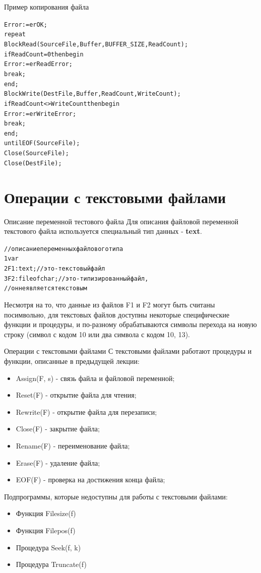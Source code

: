 \documentclass{beamer}
\begin{document}
\begin{frame}[fragile]{Пример копирования файла}
\begin{alltt}
  Error := erOK;
  repeat
    BlockRead(SourceFile, Buffer, BUFFER_SIZE, ReadCount);
    if ReadCount = 0 then begin
      Error := erReadError;
      break;
    end;
    BlockWrite(DestFile, Buffer, ReadCount, WriteCount);
    if ReadCount <> WriteCount then begin
      Error := erWriteError;
      break;
    end;
  until EOF(SourceFile);
  Close(SourceFile); 
  Close(DestFile);
\end{alltt}
\end{frame}

\section{Операции с текстовыми файлами}
\begin{frame}
  \tableofcontents[currentsection]
\end{frame}

\begin{frame}[fragile]{Описание переменной тестового файла}
Для описания файловой переменной текстового файла используется специальный тип данных - \textbf{text}.
\begin{alltt}
//описание переменных файлового типа
1 var                  
2   F1: text; //это - текстовый файл
3   F2: file of char; //это - типизированный файл,
                      //он не является текстовым
\end{alltt}
Несмотря на то, что данные из файлов F1 и F2 могут быть считаны посимвольно, для текстовых файлов доступны некоторые специфические функции и процедуры, и по-разному обрабатываются символы перехода на новую строку (символ с кодом 10 или два символа с кодом 10, 13). 
\end{frame}

\begin{frame}[fragile]{Операции с текстовыми файлами}
С текстовыми файлами работают процедуры и функции, описанные в предыдущей лекции:
\begin{itemize}
\item Assign(F, s) - связь файла и файловой переменной;
\item Reset(F) - открытие файла для чтения;
\item Rewrite(F) - открытие файла для перезаписи;
\item Close(F) - закрытие файла;
\item Rename(F) - переименование файла;
\item Erase(F) - удаление файла;
\item EOF(F) - проверка на достижения конца файла;
\end{itemize}
Подпрограммы, которые недоступны для работы с текстовыми файлами:
\begin{itemize}
\item Функция Filesize(f)
\item Функция Filepos(f)
\item Процедура Seek(f, k)
\item Процедура Truncate(f)
\end{itemize}
\end{frame} 
\end{document}
